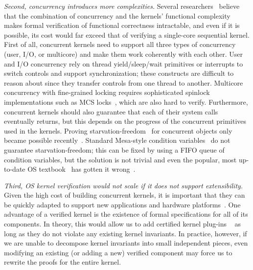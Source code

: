 {\em Second, concurrency introduces more complexities.}
Several
researchers~\cite{vontessin13,peters15} believe that the combination
of concurrency and the kernels' functional complexity makes formal
verification of functional correctness intractable, and even if it is
possible, its cost would far exceed that of verifying a single-core
sequential kernel.
First of all, concurrent kernels need to support all three types of
concurrency (user, I/O, or multicore) and make them work coherently
with each other. User and I/O concurrency rely on thread
yield/sleep/wait primitives or interrupts to switch controls and
support synchronization; these constructs are difficult to reason
about since they transfer controls from one thread to another.
Multicore concurrency with fine-grained locking requires sophisticated
spinlock implementations such as MCS locks~\cite{mcs91}, which
 are also
hard to verify.
Furthermore, concurrent kernels should also guarantee that each of their
system calls eventually returns, but this depends on the progress of
the concurrent primitives used in the kernels. Proving
starvation-freedom~\cite{Herlihy08book} for concurrent objects only
became possible recently~\cite{lili16}.  Standard Mesa-style condition
variables~\cite{lampson80} do not guarantee starvation-freedom; this
can be fixed by using a FIFO queue of condition variables, but the
solution is not trivial and even the popular, most up-to-date OS
textbook~\cite[Fig.~5.14]{ospp11} has gotten it
wrong~\cite{anderson16}.

{\em Third, OS kernel verification would not scale if it does not 
support extensibility.} Given the high cost of building concurrent kernels, it is
important that they can be quickly adapted to support new applications
and hardware platforms~\cite{bershad95,engler95,hunt07,unikernel13}. One advantage of a verified
kernel is the existence of formal specifications for all of its
components. In theory, this would allow us to add certified
kernel plug-ins
~\cite{shao10:ctos} 
as long as they do not violate any existing kernel invariants. In
practice, however, if we are unable to decompose kernel invariants
into small independent pieces, even modifying an existing (or adding a
new) verified component may force us to rewrite the proofs for the
entire kernel.


